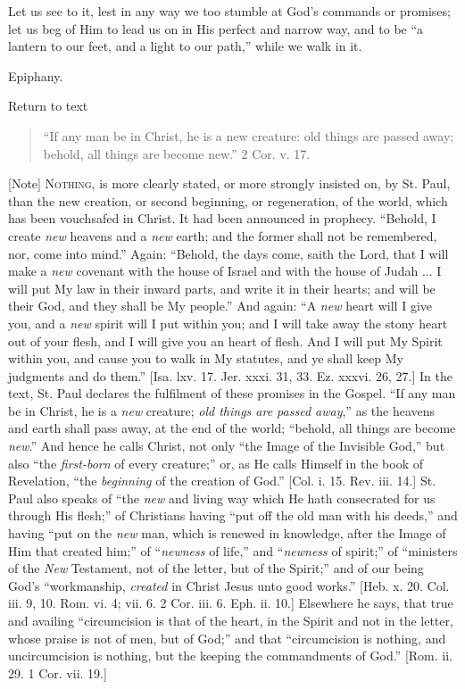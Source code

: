Let us see to it, lest in any way we too stumble at God's commands
or promises; let us beg of Him to lead us on in His perfect and narrow
way, and to be ``a lantern to our feet, and a light to our
path,'' while we walk in it.


Epiphany.

Return to text


\begin{quote}

``If any man be in Christ, he is a new creature: old things
are passed away; behold, all things are become new.'' 2 Cor. v.
17.

\end{quote}

[Note] N\textsc{othing}, is more clearly
stated, or more strongly insisted on, by St. Paul, than the new
creation, or second beginning, or regeneration, of the world, which
has been vouchsafed in Christ. It had been announced in prophecy.
``Behold, I create \emph{new} heavens and a \emph{new} earth; and
the former shall not be remembered, nor, come into mind.'' Again:
``Behold, the days come, saith the Lord, that I will make a \emph{new}
covenant with the house of Israel and with the house of Judah ... I
will put My law in their inward parts, and write it in their hearts;
and will be their God, and they shall be My people.'' And again:
``A \emph{new} heart will I give you, and a \emph{new} spirit will
I put within you; and I will take away the stony heart out of your
flesh, and I will give you an heart of flesh. And I will put My Spirit
within you, and cause you to walk in My statutes, and ye shall keep My
judgments and do them.'' [Isa. lxv. 17. Jer. xxxi. 31, 33. Ez.
xxxvi. 26, 27.] In the text, St. Paul declares the fulfilment of these
promises in the Gospel. ``If any man be in Christ, he is a \emph{new}
creature; \emph{old things are passed away},'' as the heavens and
earth shall pass away, at the end of the world; ``behold, all
things are become \emph{new}.'' And hence he calls Christ, not
only ``the Image of the Invisible God,'' but also ``the \emph{first-born}
of every creature;'' or, as He calls Himself in the book of
Revelation, ``the \emph{beginning} of the creation of God.''
[Col. i. 15. Rev. iii. 14.] St. Paul also speaks of ``the \emph{new}
and living way which He hath consecrated for us through His
flesh;'' of Christians having ``put off the old man with his
deeds,'' and having ``put on the \emph{new} man, which is
renewed in knowledge, after the Image of Him that created him;''
of ``\emph{newness} of life,'' and ``\emph{newness} of
spirit;'' of ``ministers of the \emph{New} Testament, not of
the letter, but of the Spirit;'' and of our being God's
``workmanship, \emph{created} in Christ Jesus unto good
works.'' [Heb. x. 20. Col. iii. 9, 10. Rom. vi. 4; vii. 6. 2 Cor.
iii. 6. Eph. ii. 10.] Elsewhere he says, that true and availing
``circumcision is that of the heart, in the Spirit and not in the
letter, whose praise is not of men, but of God;'' and that
``circumcision is nothing, and uncircumcision is nothing, but the
keeping the commandments of God.'' [Rom. ii. 29. 1 Cor. vii. 19.]

